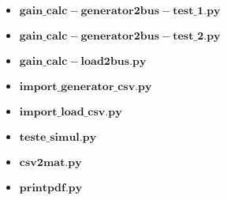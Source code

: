 \newcommand{\python}{../../../scripts/python/} 
\newcommand{\matlab}{../../../scripts/matlab/} 

\begin{itemize}
	\item $\mathbf{gain\_calc-generator2bus-test\_1.py}$\\


\newpage
\item $\mathbf{gain\_calc-generator2bus-test\_2.py}$\\


\newpage
\item $\mathbf{gain\_calc-load2bus.py}$\\

\newpage

\item $\mathbf{import\_generator\_csv.py}$\\


\newpage
\item $\mathbf{import\_load\_csv.py}$\\



\newpage
\item $\mathbf{teste\_simul.py}$\\


\end{itemize}


\begin{itemize}
	\item $\mathbf{csv2mat.py}$\\




\newpage
\item $\mathbf{printpdf.py}$\\

\end{itemize}